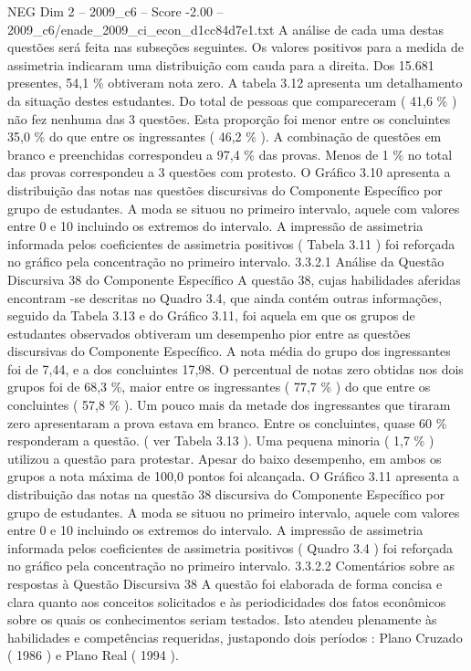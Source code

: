 \begin{textsample}{NEG Dim 2 – 2009\_c6 – Score -2.00 – 2009\_c6/enade\_2009\_ci\_econ\_d1cc84d7e1.txt}
A análise de cada uma destas questões será feita nas subseções seguintes.
Os valores positivos para a medida de assimetria indicaram uma distribuição com cauda para a direita.
Dos 15.681 presentes, 54,1 \% obtiveram nota zero.
A tabela 3.12 apresenta um detalhamento da situação destes estudantes.
Do total de pessoas que compareceram ( 41,6 \% ) não fez nenhuma das 3 questões.
Esta proporção foi menor entre os concluintes 35,0 \% do que entre os ingressantes ( 46,2 \% ).
A combinação de questões em branco e preenchidas correspondeu a 97,4 \% das provas.
Menos de 1 \% no total das provas correspondeu a 3 questões com protesto.
O Gráfico 3.10 apresenta a distribuição das notas nas questões discursivas do Componente Específico por grupo de estudantes.
A moda se situou no primeiro intervalo, aquele com valores entre 0 e 10 incluindo os extremos do intervalo.
A impressão de assimetria informada pelos coeficientes de assimetria positivos ( Tabela 3.11 ) foi reforçada no gráfico pela concentração no primeiro intervalo. 3.3.2.1 Análise da Questão Discursiva 38 do Componente Específico A questão 38, cujas habilidades aferidas encontram -se descritas no Quadro 3.4, que ainda contém outras informações, seguido da Tabela 3.13 e do Gráfico 3.11, foi aquela em que os grupos de estudantes observados obtiveram um desempenho pior entre as questões discursivas do Componente Específico.
A nota média do grupo dos ingressantes foi de 7,44, e a dos concluintes 17,98.
O percentual de notas zero obtidas nos dois grupos foi de 68,3 \%, maior entre os ingressantes ( 77,7 \% ) do que entre os concluintes ( 57,8 \% ).
Um pouco mais da metade dos ingressantes que tiraram zero apresentaram a prova estava em branco.
Entre os concluintes, quase 60 \% responderam a questão. ( ver Tabela 3.13 ).
Uma pequena minoria ( 1,7 \% ) utilizou a questão para protestar.
Apesar do baixo desempenho, em ambos os grupos a nota máxima de 100,0 pontos foi alcançada.
O Gráfico 3.11 apresenta a distribuição das notas na questão 38 discursiva do Componente Específico por grupo de estudantes.
A moda se situou no primeiro intervalo, aquele com valores entre 0 e 10 incluindo os extremos do intervalo.
A impressão de assimetria informada pelos coeficientes de assimetria positivos ( Quadro 3.4 ) foi reforçada no gráfico pela concentração no primeiro intervalo. 3.3.2.2 Comentários sobre as respostas à Questão Discursiva 38 A questão foi elaborada de forma concisa e clara quanto aos conceitos solicitados e às periodicidades dos fatos econômicos sobre os quais os conhecimentos seriam testados.
Isto atendeu plenamente às habilidades e competências requeridas, justapondo dois períodos : Plano Cruzado ( 1986 ) e Plano Real ( 1994 ).

\end{textsample}
